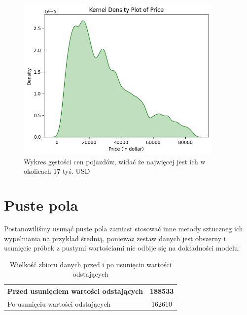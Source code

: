 \documentclass[12pt, a4paper]{report}
\begin{document}
    \begin{figure}[H]
    \centering
    \includegraphics[width=0.9\textwidth]{images/density_price.png}
    \caption{Wykres gęstości cen pojazdów, widać że najwięcej jest ich w okolicach 17 tyś. USD}
    \end{figure}
\section{Puste pola}
    Postanowiliśmy usunąć puste pola zamiast stosować inne metody sztuczneg ich wypełniania na przykład średnią, ponieważ zestaw danych jest obszerny i usunięcie próbek z pustymi wartościami nie odbije się na dokładności modelu.
\begin{table}[h!]
\centering
\begin{tabular}{|l|c|}
\hline
Przed usunięciem wartości odstających   & 188533 \\ \hline
Po usunięciu wartości odstających       & 162610 \\ \hline
\end{tabular}
\caption{Wielkość zbioru danych przed i po usunięciu wartości odstających}
\label{tab:wielkosc_zbioru}
\end{table}
    
\end{document}
